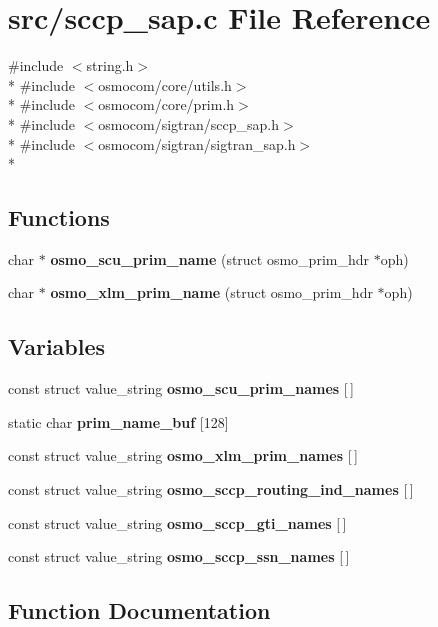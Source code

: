 \section{src/sccp\+\_\+sap.c File Reference}
\label{sccp__sap_8c}
{\ttfamily \#include $<$string.\+h$>$}\\*
{\ttfamily \#include $<$osmocom/core/utils.\+h$>$}\\*
{\ttfamily \#include $<$osmocom/core/prim.\+h$>$}\\*
{\ttfamily \#include $<$osmocom/sigtran/sccp\+\_\+sap.\+h$>$}\\*
{\ttfamily \#include $<$osmocom/sigtran/sigtran\+\_\+sap.\+h$>$}\\*
\subsection*{Functions}
\begin{DoxyCompactItemize}
\item 
char $\ast$ {\bf osmo\+\_\+scu\+\_\+prim\+\_\+name} (struct osmo\+\_\+prim\+\_\+hdr $\ast$oph)
\item 
char $\ast$ {\bf osmo\+\_\+xlm\+\_\+prim\+\_\+name} (struct osmo\+\_\+prim\+\_\+hdr $\ast$oph)
\end{DoxyCompactItemize}
\subsection*{Variables}
\begin{DoxyCompactItemize}
\item 
const struct value\+\_\+string {\bf osmo\+\_\+scu\+\_\+prim\+\_\+names} [$\,$]
\item 
static char {\bf prim\+\_\+name\+\_\+buf} [128]
\item 
const struct value\+\_\+string {\bf osmo\+\_\+xlm\+\_\+prim\+\_\+names} [$\,$]
\item 
const struct value\+\_\+string {\bf osmo\+\_\+sccp\+\_\+routing\+\_\+ind\+\_\+names} [$\,$]
\item 
const struct value\+\_\+string {\bf osmo\+\_\+sccp\+\_\+gti\+\_\+names} [$\,$]
\item 
const struct value\+\_\+string {\bf osmo\+\_\+sccp\+\_\+ssn\+\_\+names} [$\,$]
\end{DoxyCompactItemize}


\subsection{Function Documentation}
